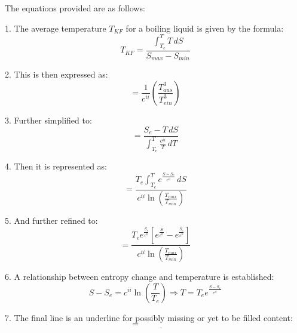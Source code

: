 The equations provided are as follows:

1. The average temperature \( T_{KF} \) for a boiling liquid is given by the formula:
\[ T_{KF} = \frac{\int_{T_e}^{T} T \, dS}{S_{max} - S_{min}} \]

2. This is then expressed as:
\[ = \frac{1}{c^{ii}} \left( \frac{T_{aus}^3}{T_{ein}^3} \right) \]

3. Further simplified to:
\[ = \frac{S_e - T \, dS}{\int_{T_e}^{T} \frac{c^{ii}}{T} \, dT} \]

4. Then it is represented as:
\[ = \frac{T_e \int_{T_e}^{T} e^{\frac{S - S_e}{c^{ii}}} \, dS}{c^{ii} \ln \left( \frac{T_{max}}{T_{min}} \right)} \]

5. And further refined to:
\[ = \frac{T_e e^{\frac{S_e}{c^{ii}}} \left[ e^{\frac{S}{c^{ii}}} - e^{\frac{S_e}{c^{ii}}} \right]}{c^{ii} \ln \left( \frac{T_{max}}{T_{min}} \right)} \]

6. A relationship between entropy change and temperature is established:
\[ S - S_e = c^{ii} \ln \left( \frac{T}{T_e} \right) \Rightarrow T = T_e e^{\frac{S - S_e}{c^{ii}}} \]

7. The final line is an underline for possibly missing or yet to be filled content:
\[ = \underline{\hspace{2cm}} \]